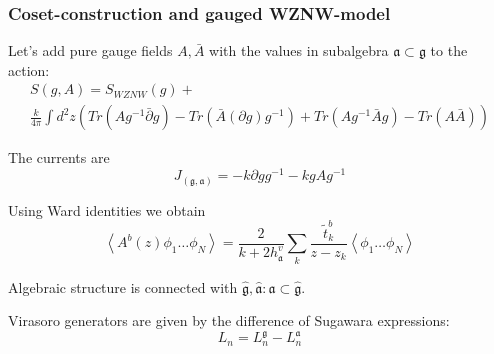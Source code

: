 \documentclass[pdftex]{beamer}
\newcommand{\gf}{\mathfrak{g}}
\newcommand{\gfh}{\hat{\mathfrak{g}}}
\newcommand{\af}{\mathfrak{a}}
\newcommand{\afh}{\hat{\mathfrak{a}}}
\theoremstyle{definition} \newtheorem{Def}{Definition}
\begin{document}
\begin{frame}
  \frametitle{Coset-construction and gauged WZNW-model}

  Let's add pure gauge fields  $A, \bar{A}$ with the values in subalgebra $\af\subset \gf$ to the action:
  \begin{multline*}
    S(g,A)=S_{WZNW}(g)+\\
    \frac{k}{4\pi}\int d^{2}z \left(Tr(A g^{-1}\bar \partial g)-Tr(\bar A (\partial g ) g^{-1})+Tr(A g^{-1}\bar A g)-Tr(A \bar A)\right)
  \end{multline*}

  The currents are
  \begin{equation*}
    J_{(\gf,\af)}=-k\partial g g^{-1} -k g A g^{-1}
  \end{equation*}

  Using Ward identities we obtain
  \begin{equation*}
    \left< A^{b}(z)\phi_{1}\dots \phi_{N}\right>=\frac{2}{k+2 h^{v}_{\af}}\sum_{k}\frac{\tilde{t}^{b}_{k}}{z-z_{k}}\left<\phi_{1}\dots \phi_{N}\right>
  \end{equation*}


  Algebraic structure is connected with  $\gfh, \afh: \afh\subset\gfh$. 

  Virasoro generators are given by the difference of Sugawara expressions:
  \begin{equation*}
    L_{n}=L_{n}^{\gf}-L_{n}^{\af}
  \end{equation*}
\end{frame}
\end{document}
